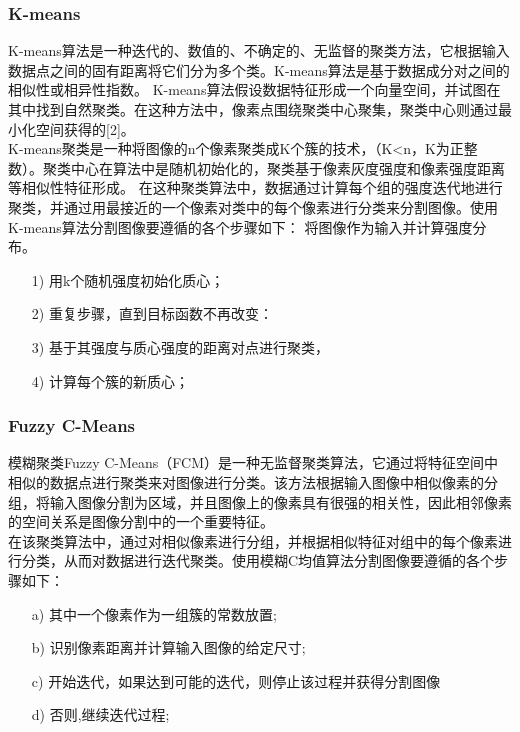 \documentclass[conference]{IEEEtran}
\begin{document}
\subsubsection{K-means}
K-means算法是一种迭代的、数值的、不确定的、无监督的聚类方法，它根据输入数据点之间的固有距离将它们分为多个类。K-means算法是基于数据成分对之间的相似性或相异性指数。
K-means算法假设数据特征形成一个向量空间，并试图在其中找到自然聚类。在这种方法中，像素点围绕聚类中心聚集，聚类中心则通过最小化空间获得的[2]。\\K-means聚类是一种将图像的n个像素聚类成K个簇的技术，（K<n，K为正整数）。聚类中心在算法中是随机初始化的，聚类基于像素灰度强度和像素强度距离等相似性特征形成。
在这种聚类算法中，数据通过计算每个组的强度迭代地进行聚类，并通过用最接近的一个像素对类中的每个像素进行分类来分割图像。使用K-means算法分割图像要遵循的各个步骤如下：
将图像作为输入并计算强度分布。
\begin{itemize}
\item[1)]用k个随机强度初始化质心；

\item[2)]重复步骤，直到目标函数不再改变：
\item[3)]基于其强度与质心强度的距离对点进行聚类，
\item[4)]计算每个簇的新质心；
\end{itemize}
\subsubsection{Fuzzy C-Means}
模糊聚类Fuzzy C-Means（FCM）是一种无监督聚类算法，它通过将特征空间中相似的数据点进行聚类来对图像进行分类。该方法根据输入图像中相似像素的分组，将输入图像分割为区域，并且图像上的像素具有很强的相关性，因此相邻像素的空间关系是图像分割中的一个重要特征。\\
在该聚类算法中，通过对相似像素进行分组，并根据相似特征对组中的每个像素进行分类，从而对数据进行迭代聚类。使用模糊C均值算法分割图像要遵循的各个步骤如下：
\begin{itemize}
\item [a)]其中一个像素作为一组簇的常数放置;
\item [b)]识别像素距离并计算输入图像的给定尺寸;
\item [c)]开始迭代，如果达到可能的迭代，则停止该过程并获得分割图像
\item [d)]否则,继续迭代过程;
\end{itemize}
\end{document}
